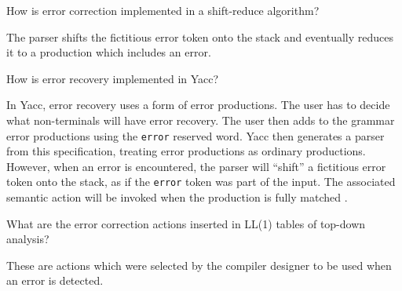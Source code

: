 \begin{Exercise}
How is error correction implemented in a shift-reduce algorithm?
\end{Exercise}
\begin{Answer}
The parser shifts the fictitious error token onto the stack and eventually reduces it to a production which includes an error.
\end{Answer}

\begin{Exercise}[difficulty=1]
How is error recovery implemented in Yacc?
\end{Exercise}
\begin{Answer}
In Yacc, error recovery uses a form of error productions.
The user has to decide what non-terminals will have error recovery.
The user then adds to the grammar error productions using the \texttt{error} reserved word.
Yacc then generates a parser from this specification, treating error productions as ordinary productions.
However, when an error is encountered, the parser will ``shift'' a fictitious error token onto the stack, as if the \texttt{error} token was part of the input.
The associated semantic action will be invoked when the production is fully matched \cite[p.~295]{compilers-aho-2007}.
\end{Answer}

\begin{Exercise}
What are the error correction actions inserted in LL(1) tables of top-down analysis?
\end{Exercise}
\begin{Answer}
These are actions which were selected by the compiler designer to be used when an error is detected.
\end{Answer}

